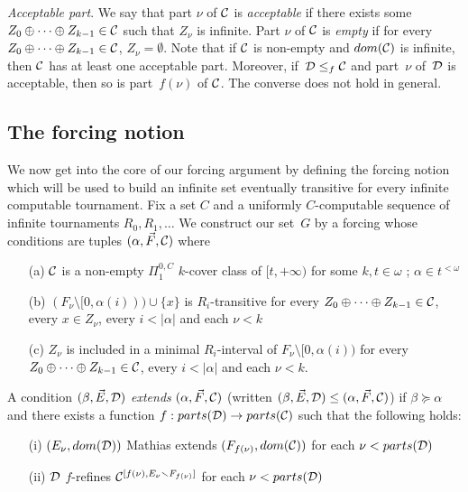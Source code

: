 \smallskip
\emph{Acceptable part}. 
We say that part $\nu$ of $\mathcal{C}$ is \emph{acceptable} if there exists some $Z_0 \oplus \dots \oplus Z_{k-1} \in \mathcal{C}$
such that $Z_\nu$ is infinite. Part $\nu$ of $\mathcal{C}$ is \emph{empty} if 
for every $Z_0 \oplus \dots \oplus Z_{k-1} \in \mathcal{C}$, $Z_\nu = \emptyset$.
Note that if $\mathcal{C}$ is non-empty and $dom(\mathcal{C})$ is infinite, then $\mathcal{C}$ has at least one acceptable part.
Moreover, if~$\mathcal{D} \leq_f \mathcal{C}$ and part~$\nu$ of~$\mathcal{D}$ is acceptable, then so is part~$f(\nu)$ of $\mathcal{C}$.
The converse does not hold in general.

\subsection{The forcing notion}

We now get into the core of our forcing argument by defining
the forcing notion which will be used to build an infinite set eventually
transitive for every infinite computable tournament.
Fix a set $C$ and a uniformly $C$-computable sequence of infinite tournaments $R_0, R_1, \dots$
We construct our set~$G$ by a forcing whose conditions are tuples $(\alpha, \vec{F}, \mathcal{C})$ where
\begin{itemize}
	\item[(a)] $\mathcal{C}$ is a non-empty $\Pi^{0,C}_1$ $k$-cover class of $[t, +\infty)$ 
	for some $k, t \in \omega$ ; $\alpha \in t^{<\omega}$
	\item[(b)] $(F_\nu \setminus [0, \alpha(i))) \cup \{x\}$ is $R_i$-transitive for every $Z_0 \oplus \dots \oplus Z_{k-1} \in \mathcal{C}$,
	every $x \in Z_\nu$, every $i < |\alpha|$ and each $\nu < k$
	\item[(c)] $Z_\nu$ is included in a minimal $R_i$-interval of $F_\nu \setminus [0, \alpha(i))$
	for every $Z_0 \oplus \dots \oplus Z_{k-1} \in \mathcal{C}$, every $i < |\alpha|$ and each $\nu < k$.
\end{itemize}
A condition $(\beta, \vec{E}, \mathcal{D})$ \emph{extends} 
$(\alpha, \vec{F}, \mathcal{C})$
(written $(\beta, \vec{E}, \mathcal{D}) \leq (\alpha, \vec{F}, \mathcal{C})$) if $\beta \succeq \alpha$
and there exists a function $f : parts(\mathcal{D}) \to parts(\mathcal{C})$ such that the following holds:
\begin{itemize}
	\item[(i)] $(E_\nu, dom(\mathcal{D}))$ Mathias extends $(F_{f(\nu)}, dom(\mathcal{C}))$ for each $\nu < parts(\mathcal{D})$ 
	\item[(ii)] $\mathcal{D}$ $f$-refines $\mathcal{C}^{[f(\nu), E_\nu \smallsetminus F_{f(\nu)}]}$ for each $\nu < parts(\mathcal{D})$
\end{itemize}

